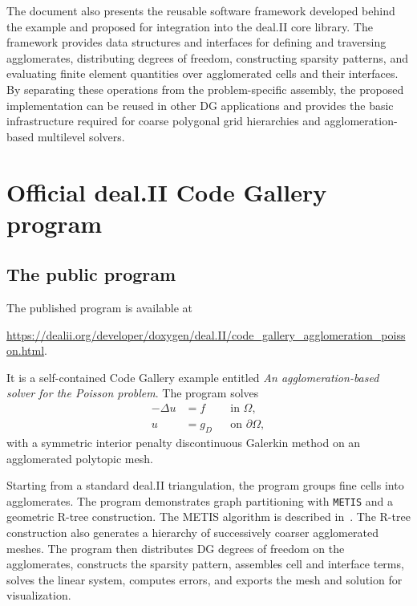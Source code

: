 \documentclass[a4paper,12pt]{article}
\begin{document}
The document also presents the reusable software framework developed behind
the example and proposed for integration into the deal.II core library. The
framework provides data structures and interfaces for defining and traversing
agglomerates, distributing degrees of freedom, constructing sparsity patterns,
and evaluating finite element quantities over agglomerated cells and their
interfaces. By separating these operations from the problem-specific
assembly, the proposed implementation can be reused in other DG applications
and provides the basic infrastructure required for coarse polygonal grid
hierarchies and agglomeration-based multilevel solvers.


\section{{Official deal.II Code Gallery program}}
\label{sec:code_gallery}

\subsection{{The public program}}

The published program is available at
\begin{center}
\url{https://dealii.org/developer/doxygen/deal.II/code_gallery_agglomeration_poisson.html}.
\end{center}
It is a self-contained Code Gallery example entitled \emph{An
agglomeration-based solver for the Poisson problem}. The program solves
\begin{equation}
    \begin{aligned}
        -\Delta u &= f && \text{in } \Omega,\\
                 u &= g_D && \text{on } \partial\Omega,
    \end{aligned}
\end{equation}
with a symmetric interior penalty discontinuous Galerkin method on an
agglomerated polytopic mesh.

Starting from a standard deal.II triangulation, the program groups fine cells
into agglomerates. The program demonstrates graph partitioning with
\texttt{METIS} and a geometric R-tree construction. The METIS algorithm is
described in~\citep{METIS}. The R-tree construction also generates a hierarchy
of successively coarser agglomerated meshes. The program then distributes DG
degrees of freedom on the agglomerates, constructs the sparsity pattern,
assembles cell and interface terms, solves the linear system, computes errors,
and exports the mesh and solution for visualization.
\end{document}
